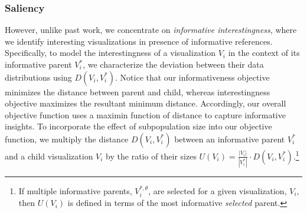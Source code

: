 \subsubsection{Saliency}
However, unlike past work, we concentrate 
on \emph{informative interestingness}, where we 
identify interesting visualizations 
in presence of informative references. 
Specifically, to model the interestingness 
of a visualization $V_i$ in the context of its informative parent $V_i^*$, we characterize the deviation between their data distributions using $D(V_i, V_i^*)$. Notice that our informativeness objective minimizes the distance between parent and child, whereas interestingness objective maximizes the resultant minimum distance. Accordingly, our overall objective function uses a maximin function of distance to capture informative insights. To incorporate the effect of subpopulation size into our objective function, we multiply the distance $D(V_i, V_i^*)$ between an informative parent $V_i^*$ and a child visualization $V_i$ by the ratio of their sizes  $U(V_i) = \frac{|V_i|}{|V_i^*|} \cdot D(V_i, V_i^*)$.\footnote{If multiple informative parents, $V_i^{*, \theta}$, are selected for a given visualization, $V_i$, then $U(V_i)$ is defined in terms of the most informative {\em selected} parent.}
